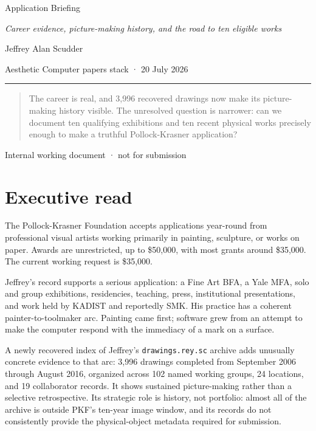 \documentclass[11pt,letterpaper]{article}
\begin{document}
\thispagestyle{empty}
\vspace*{0.35in}
\begin{center}
{\fontsize{18pt}{22pt}\selectfont\color{acdark}Application Briefing}\par
\vspace{0.7em}
{\large\itshape\color{acgray}Career evidence, picture-making history, and the road to ten eligible works}\par
\vspace{1.1em}
{\normalsize Jeffrey Alan Scudder}\par
{\small\color{acgray}Aesthetic Computer papers stack · 20 July 2026}\par
\vspace{1.4em}
{\color{acpink}\rule{0.72\textwidth}{1.2pt}}
\end{center}

\vfill
\begin{quote}
\large
The career is real, and 3,996 recovered drawings now make its picture-making history visible. The unresolved question is narrower: can we document ten qualifying exhibitions and ten recent physical works precisely enough to make a truthful Pollock-Krasner application?
\end{quote}
\vfill
\begin{center}
{\small\color{acgray}Internal working document · not for submission}\par
\end{center}
\clearpage

\section{Executive read}

The Pollock-Krasner Foundation accepts applications year-round from professional visual artists working primarily in painting, sculpture, or works on paper. Awards are unrestricted, up to \$50,000, with most grants around \$35,000. The current working request is \$35,000.

Jeffrey's record supports a serious application: a Fine Art BFA, a Yale MFA, solo and group exhibitions, residencies, teaching, press, institutional presentations, and work held by KADIST and reportedly SMK. His practice has a coherent painter-to-toolmaker arc. Painting came first; software grew from an attempt to make the computer respond with the immediacy of a mark on a surface.

A newly recovered index of Jeffrey's \texttt{drawings.rey.sc} archive adds unusually concrete evidence to that arc: 3,996 drawings completed from September 2006 through August 2016, organized across 102 named working groups, 24 locations, and 19 collaborator records. It shows sustained picture-making rather than a selective retrospective. Its strategic role is history, not portfolio: almost all of the archive is outside PKF's ten-year image window, and its records do not consistently provide the physical-object metadata required for submission.
\end{document}
